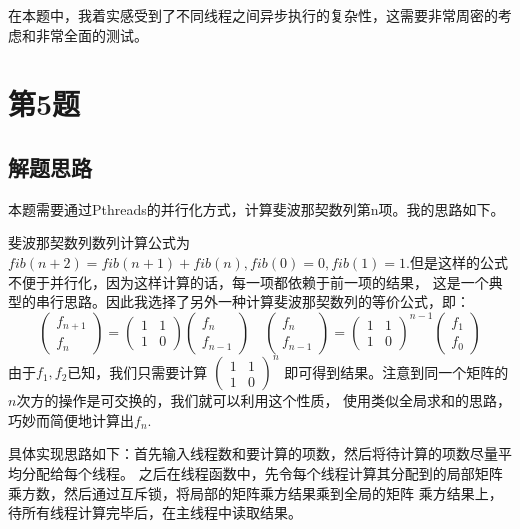 \documentclass[UTF8]{article}
\begin{document}
在本题中，我着实感受到了不同线程之间异步执行的复杂性，这需要非常周密的考虑和非常全面的测试。




\section{第5题}
\subsection{解题思路}
本题需要通过Pthreads的并行化方式，计算斐波那契数列第n项。我的思路如下。

斐波那契数列数列计算公式为$fib(n+2)=fib(n+1)+fib(n), fib(0)=0, fib(1)=1$.但是这样的公式不便于并行化，因为这样计算的话，每一项都依赖于前一项的结果，
这是一个典型的串行思路。因此我选择了另外一种计算斐波那契数列的等价公式，即：
$$   \left(\begin{array}{c}
      f_{n+1} \\
      f_{n}
      \end{array}\right)=\left(\begin{array}{cc}
      1 & 1 \\
      1 & 0
      \end{array}\right)\left(\begin{array}{c}
      f_{n} \\
      f_{n-1}
      \end{array}\right) \quad\left(\begin{array}{c}
      f_{n} \\
      f_{n-1}
      \end{array}\right)=\left(\begin{array}{cc}
      1 & 1 \\
      1 & 0
      \end{array}\right)^{n-1}\left(\begin{array}{c}
      f_{1} \\
      f_{0}
      \end{array}\right)
$$
由于$f_1, f_2$已知，我们只需要计算
$\left(\begin{array}{cc}
   1 & 1 \\
   1 & 0
   \end{array}\right)^{n}$
即可得到结果。注意到同一个矩阵的$n$次方的操作是可交换的，我们就可以利用这个性质，
使用类似全局求和的思路，
巧妙而简便地计算出$f_n$.

具体实现思路如下：首先输入线程数和要计算的项数，然后将待计算的项数尽量平均分配给每个线程。
之后在线程函数中，先令每个线程计算其分配到的局部矩阵乘方数，然后通过互斥锁，将局部的矩阵乘方结果乘到全局的矩阵
乘方结果上，待所有线程计算完毕后，在主线程中读取结果。
\end{document}
